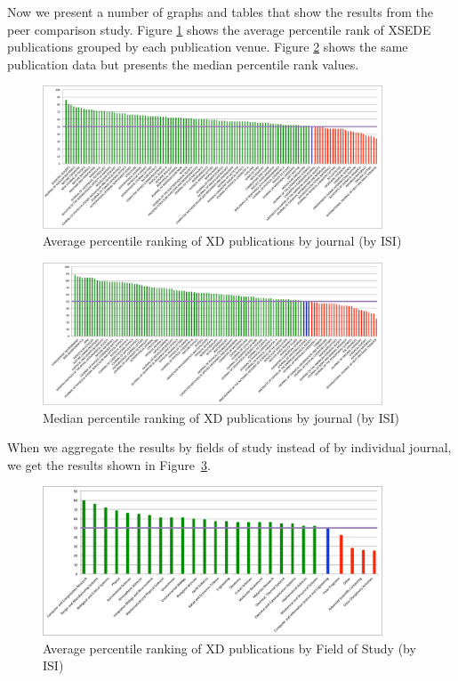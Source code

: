 \documentclass[sigconf]{acmart}
\begin{document}
Now we present a number of graphs and tables that show the results
from the peer comparison study. Figure \ref{F:isi_peers_byj_mean}
shows the average percentile rank of XSEDE publications grouped by
each publication venue. Figure \ref{F:isi_peers_byj_median} shows the
same publication data but presents the median percentile rank values.

\begin{figure}[htb!]
  \centering
    \includegraphics[width=0.9\textwidth]{images/isi_peers_byj_mean.pdf}
    \caption{Average percentile ranking of XD publications by journal (by ISI)}
    \label{F:isi_peers_byj_mean}
\end{figure}

\begin{figure}[htb!]
  \centering
    \includegraphics[width=0.9\textwidth]{images/isi_peers_byj_median.pdf}
    \caption{Median percentile ranking of XD publications by journal (by ISI)}
    \label{F:isi_peers_byj_median}
\end{figure}

When we aggregate the results by fields of study instead of by
individual journal, we get the results shown in Figure~\ref{F:isi_peers_fos}.

\begin{figure}[htb!]
  \centering
    \includegraphics[width=0.9\textwidth]{images/isi_peers_fos.pdf}
    \caption{Average percentile ranking of XD publications by Field of Study (by ISI)}
    \label{F:isi_peers_fos}
\end{figure}
\end{document}
